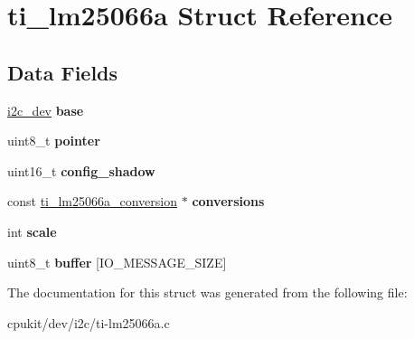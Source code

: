\hypertarget{structti__lm25066a}{}\section{ti\+\_\+lm25066a Struct Reference}
\label{structti__lm25066a}
\subsection*{Data Fields}
\begin{DoxyCompactItemize}
\item 
\mbox{\label{structti__lm25066a_a5b11e27cac55b2d9385214176fc9871f}} 
\mbox{\hyperlink{structi2c__dev}{i2c\+\_\+dev}} {\bfseries base}
\item 
\mbox{\label{structti__lm25066a_a639829f1a4b8c2dc8f45c0fb7535c51a}} 
uint8\+\_\+t {\bfseries pointer}
\item 
\mbox{\label{structti__lm25066a_aff7fac64a71070e67a3ca1def10b48ab}} 
uint16\+\_\+t {\bfseries config\+\_\+shadow}
\item 
\mbox{\label{structti__lm25066a_a9e0244b1ad64dfb907e1cb8ff41a4efa}} 
const \mbox{\hyperlink{structti__lm25066a__conversion}{ti\+\_\+lm25066a\+\_\+conversion}} $\ast$ {\bfseries conversions}
\item 
\mbox{\label{structti__lm25066a_abd516bf197dded625731e3a98d9b285e}} 
int {\bfseries scale}
\item 
\mbox{\label{structti__lm25066a_a9ec130f3160b0323440d88a18ec3d392}} 
uint8\+\_\+t {\bfseries buffer} \mbox{[}I\+O\+\_\+\+M\+E\+S\+S\+A\+G\+E\+\_\+\+S\+I\+ZE\mbox{]}
\end{DoxyCompactItemize}


The documentation for this struct was generated from the following file\+:\begin{DoxyCompactItemize}
\item 
cpukit/dev/i2c/ti-\/lm25066a.\+c\end{DoxyCompactItemize}
